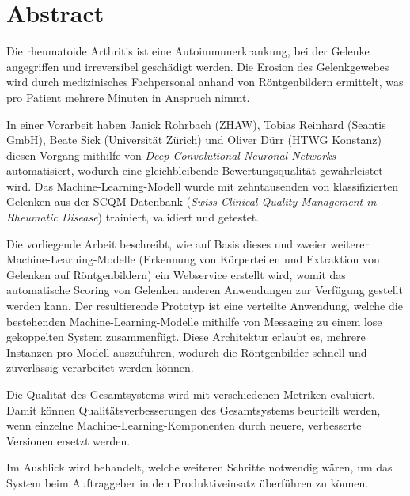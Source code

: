 \section*{Abstract}

Die rheumatoide Arthritis ist eine Autoimmunerkrankung, bei der Gelenke angegriffen und irreversibel geschädigt werden. Die Erosion des Gelenkgewebes wird durch medizinisches Fachpersonal anhand von Röntgenbildern ermittelt, was pro Patient mehrere Minuten in Anspruch nimmt.

In einer Vorarbeit haben Janick Rohrbach (ZHAW), Tobias Reinhard (Seantis GmbH), Beate Sick (Universität Zürich) und Oliver Dürr (HTWG Konstanz) diesen Vorgang mithilfe von \textit{Deep Convolutional Neuronal Networks} automatisiert, wodurch eine gleichbleibende Bewertungsqualität gewährleistet wird. Das Ma\-chine-Learn\-ing-Modell wurde mit zehntausenden von klassifizierten Gelenken aus der SCQM-Datenbank (\textit{Swiss Clinical Quality Management in Rheumatic Disease}) trainiert, validiert und getestet.

Die vorliegende Arbeit beschreibt, wie auf Basis dieses und zweier weiterer Ma\-chine-Learn\-ing-Modelle (Erkennung von Körperteilen und Extraktion von Gelenken auf Röntgenbildern) ein Webservice erstellt wird, womit das automatische Scoring von Gelenken anderen Anwendungen zur Verfügung gestellt werden kann. Der resultierende Prototyp ist eine verteilte Anwendung, welche die bestehenden Ma\-chine-Learn\-ing-Modelle mithilfe von Messaging zu einem lose gekoppelten System zusammenfügt. Diese Architektur erlaubt es, mehrere Instanzen pro Modell auszuführen, wodurch die Röntgenbilder schnell und zuverlässig verarbeitet werden können.

Die Qualität des Gesamtsystems wird mit verschiedenen Metriken evaluiert. Damit können Qualitätsverbesserungen des Gesamtsystems beurteilt werden, wenn einzelne Ma\-chine-Learn\-ing-Komponenten durch neuere, verbesserte Versionen ersetzt werden. 

Im Ausblick wird behandelt, welche weiteren Schritte notwendig wären, um das System beim Auftraggeber in den Produktiveinsatz überführen zu können.
